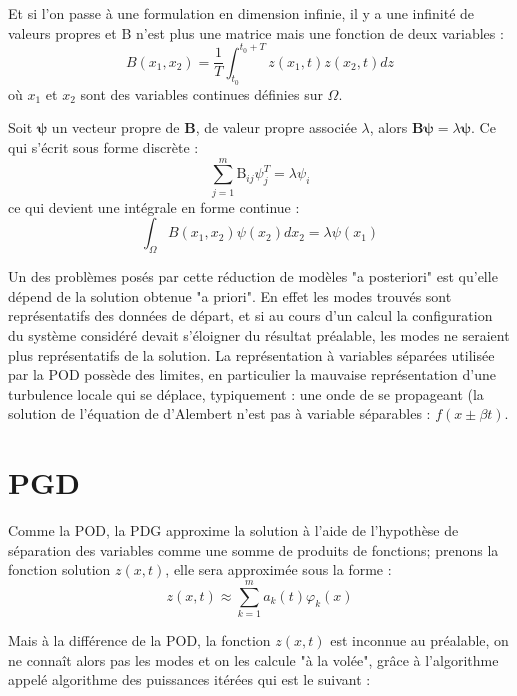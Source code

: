 \documentclass[12pt,a4paper]{report}
\begin{document}
Et si l'on passe à une formulation en dimension infinie, il y a une infinité de valeurs propres et B n'est plus une matrice mais une fonction de deux variables :
\begin{equation}
	B(x_1,x_2) = \frac{1}{T} 
			\int_{t_0}^{t_0+T} z(x_1,t) z(x_2,t)dz
\end{equation}
où $x_1$ et $x_2$ sont des variables continues définies sur $\Omega$. 

Soit $\boldsymbol{\psi}$ un vecteur propre de $\mathbf{B}$, de valeur propre associée $\lambda$, alors $\mathbf{B}\boldsymbol{\psi} = \lambda\boldsymbol{\psi}$. Ce qui s'écrit sous forme discrète :
\begin{equation}
\sum^m_{j=1} \text{B}_{ij} \psi_j^T = \lambda\psi_i
\end{equation}
ce qui devient une intégrale en forme continue :
\begin{equation}
\int_\Omega B(x_1,x_2) \psi(x_2) dx_2 = \lambda\psi(x_1 )
\end{equation}

Un des problèmes posés par cette réduction de modèles "a posteriori" est qu'elle dépend de la solution obtenue "a priori". En effet les modes trouvés sont représentatifs des données de départ, et si au cours d'un calcul la configuration du système considéré devait s'éloigner du résultat préalable, les modes ne seraient plus représentatifs de la solution. La représentation à variables séparées utilisée par la POD possède des limites, en particulier la mauvaise représentation d'une turbulence locale qui se déplace, typiquement : une onde de se propageant (la solution de l'équation de d'Alembert n'est pas à variable séparables : $f(x \pm \beta t )$.

\section{PGD}
Comme la POD, la PDG approxime la solution à l'aide de l'hypothèse de séparation des variables comme une somme de produits de fonctions; prenons la fonction solution $ z(x,t)$, elle sera approximée sous la forme :
\begin{equation}
z(x,t) \approx \sum^m_{k=1} a_k(t) \varphi_k(x)
\end{equation}

Mais à la différence de la POD, la fonction $z(x,t)$ est inconnue au préalable, on ne connaît alors pas les modes et on les calcule "à la volée", grâce à l'algorithme appelé algorithme des puissances itérées qui est le suivant :
\end{document}
